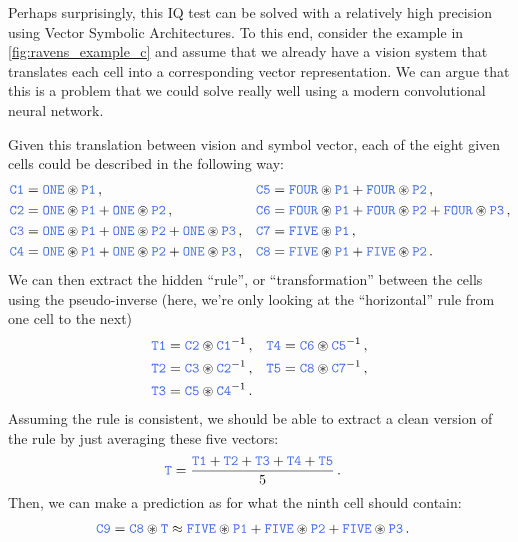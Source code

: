 \documentclass[10pt,letterpaper,oneside]{article}
\begin{document}
Perhaps surprisingly, this IQ test can be solved with a relatively high precision using Vector Symbolic Architectures. To this end, consider the example in \cref{fig:ravens_example_c} and assume that we already have a vision system that translates each cell into a corresponding vector representation. We can argue that this is a problem that we could solve really well using a modern convolutional neural network.

Given this translation between vision and symbol vector, each of the eight given cells could be described in the following way:
\begin{align*}
	\Obj{C1} &= \Obj{ONE}  \CC \Obj{P1}                                                       \,, &
	\Obj{C5} &= \Obj{FOUR} \CC \Obj{P1} + \Obj{FOUR} \CC \Obj{P2}                             \,, \\
	\Obj{C2} &= \Obj{ONE}  \CC \Obj{P1} + \Obj{ONE}  \CC \Obj{P2}                             \,, &
	\Obj{C6} &= \Obj{FOUR} \CC \Obj{P1} + \Obj{FOUR} \CC \Obj{P2} + \Obj{FOUR} \CC \Obj{P3}   \,, \\
	\Obj{C3} &= \Obj{ONE}  \CC \Obj{P1} + \Obj{ONE}  \CC \Obj{P2} + \Obj{ONE}  \CC \Obj{P3}   \,, &
	\Obj{C7} &= \Obj{FIVE} \CC \Obj{P1}                                                       \,, \\
	\Obj{C4} &= \Obj{ONE}  \CC \Obj{P1} + \Obj{ONE}  \CC \Obj{P2} + \Obj{ONE}  \CC \Obj{P3}   \,, &
	\Obj{C8} &= \Obj{FIVE} \CC \Obj{P1} + \Obj{FIVE} \CC \Obj{P2}                             \,.
\end{align*}
We can then extract the hidden \enquote{rule}, or \enquote{transformation} between the cells using the pseudo-inverse (here, we're only looking at the \enquote{horizontal} rule from one cell to the next)
\begin{align*}
	\Obj{T1} &= \Obj{C2} \CC \Obj{C1}^{-1} \,, &
	\Obj{T4} &= \Obj{C6} \CC \Obj{C5}^{-1} \,, \\
	\Obj{T2} &= \Obj{C3} \CC \Obj{C2}^{-1} \,, &
	\Obj{T5} &= \Obj{C8} \CC \Obj{C7}^{-1} \,, \\
	\Obj{T3} &= \Obj{C5} \CC \Obj{C4}^{-1} \,.
\end{align*}
Assuming the rule is consistent, we should be able to extract a clean version of the rule by just averaging these five vectors:
\begin{align*}
	\Obj{T} &= \frac{\Obj{T1} + \Obj{T2} + \Obj{T3} + \Obj{T4} + \Obj{T5}}5 \,.
\end{align*}
Then, we can make a prediction as for what the ninth cell should contain:
\begin{align*}
	\Obj{C9} &= \Obj{C8} \CC \Obj{T} \approx \Obj{FIVE}  \CC \Obj{P1} + \Obj{FIVE}  \CC \Obj{P2} + \Obj{FIVE}  \CC \Obj{P3} \,.
\end{align*}
\pagebreak
{}
\end{document}
